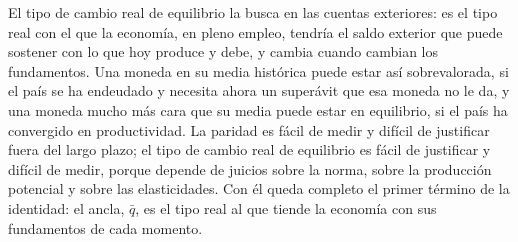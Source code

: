 \documentclass[10pt,a4paper]{article}
\begin{document}
El tipo de cambio real de equilibrio la busca en las cuentas exteriores: es el tipo real con el que la economía, en pleno empleo, tendría el saldo exterior que puede sostener con lo que hoy produce y debe, y cambia cuando cambian los fundamentos. Una moneda en su media histórica puede estar así sobrevalorada, si el país se ha endeudado y necesita ahora un superávit que esa moneda no le da, y una moneda mucho más cara que su media puede estar en equilibrio, si el país ha convergido en productividad. La paridad es fácil de medir y difícil de justificar fuera del largo plazo; el tipo de cambio real de equilibrio es fácil de justificar y difícil de medir, porque depende de juicios sobre la norma, sobre la producción potencial y sobre las elasticidades. Con él queda completo el primer término de la identidad: el ancla, $\bar q$, es el tipo real al que tiende la economía con sus fundamentos de cada momento.










\clearpage
\end{document}
